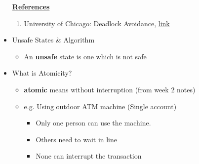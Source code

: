 \documentclass[12pt]{article}
\begin{document}
\begin{itemize}
\begin{itemize}
    \end{itemize}

    \bigskip

    \underline{\textbf{References}}

    \bigskip

    \begin{enumerate}[1)]
        \item University of Chicago: Deadlock Avoidance, \href{https://www.cs.uic.edu/~jbell/CourseNotes/OperatingSystems/7_Deadlocks.html}{link}
    \end{enumerate}
    \item Unsafe States \& Algorithm
    \begin{itemize}
        \item An \textbf{unsafe} state is one which is not safe
    \end{itemize}
    \item What is Atomicity?
    \begin{itemize}
        \item \textbf{atomic} means without interruption (from week 2 notes)
        \item e.g. Using outdoor ATM machine (Single account)
        \begin{itemize}
            \item Only one person can use the machine.
            \item Others need to wait in line
            \item None can interrupt the transaction
        \end{itemize}
    \end{itemize}


\end{itemize}
\end{document}
